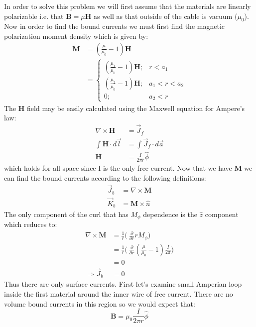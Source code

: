 \documentclass[a4paper, 11pt]{article}
\begin{document}
\noindent In order to solve this problem we will first assume that the materials are linearly polarizable i.e. that $\mathbf{B} = \mu \mathbf{H}$ as well as that outside of the cable is vacuum ($\mu_0$). Now in order to find the bound currents we must first find the magnetic polarization moment density which is given by: 
	\begin{align}
		\mathbf{M} &= (\frac{\mu}{\mu_0} -1)\mathbf{H} \\ 
			&= \begin{cases}
				(\frac{\mu_1}{\mu_0} -1)\mathbf{H}; &r<a_1 \\ 
				(\frac{\mu_2}{\mu_0} -1)\mathbf{H}; &a_1<r<a_2 \\ 
				0;& a_2<r
			\end{cases}
	\end{align}
The \textbf{H} field may be easily calculated using the Maxwell equation for Ampere's law: 
	\begin{align*}
		\nabla \times \mathbf{H} &= \vec{J}_f \\ 
		\int \mathbf{H} \cdot d\vec{l} &= \int \vec{J}_f \cdot d\vec{a} \\ 
		\mathbf{H} &= \frac{I}{2\pi r}\hat{\phi}
	\end{align*}
which holds for all space since I is the only free current. Now that we have \textbf{M} we can find the bound currents according to the following definitions: 
	\begin{align}
		\vec{J}_b &= \nabla \times \mathbf{M} \\ 
		\vec{K}_b &= \mathbf{M} \times \hat{n} 
	\end{align}
The only component of the curl that has $M_\phi$ dependence is the $\hat{z}$ component which reduces to: 	
	\begin{align*}
		\nabla \times \mathbf{M}&= \frac{1}{r}\Bigg(\ \frac{\partial}{\partial r}rM_\phi \Bigg) \\ 
		&= \frac{1}{r} \Bigg(\ \frac{\partial}{\partial r}(\frac{\mu}{\mu_0}-1)\frac{I}{2\pi}\Bigg) \\ 
		&= 0 \\ 
		\Rightarrow \vec{J}_b &= 0 
	\end{align*}
Thus there are only surface currents. First let's examine small Amperian loop inside the first material around the inner wire of free current. There are no volume bound currents in this region so we would expect that: 
	\begin{equation}
		\mathbf{B} = \mu_0 \frac{I}{2\pi r}\hat{\phi} 
	\end{equation}
\end{document}
